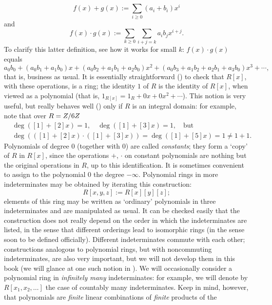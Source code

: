 \[
  f(x) + g(x) := \sum_{i \geq 0} (a_i + b_i) x^i
\]
and
\[
  f(x) \cdot g(x) := \sum_{k \geq 0} \sum_{i+j=k} a_i b_j x^{i+j}.
\]
To clarify this latter definition, see how it works for small $k$:
$f(x) \cdot g(x)$ equals
\[
  a_0 b_0 + (a_0 b_1 + a_1 b_0)x + (a_0 b_2 + a_1 b_1 + a_2 b_0)x^2 +
  (a_0 b_3 + a_1 b_2 + a_2 b_1 + a_3 b_0)x^3 + \cdots,
\]
that is, business as usual.  It is essentially straightforward
() to check that $R[x]$, with these
operations, is a ring; the identity $1$ of $R$ is the identity of
$R[x]$, when viewed as a polynomial (that is,
$1_{R[x]} = 1_R + 0x + 0x^2 + \cdots$).   This
notion is very useful, but really behaves well
() only if $R$ is an integral
domain: for example, note that over $R = Z/6Z$
\begin{align*}
  &\deg([1] + [2]x) = 1, \quad \deg([1] + [3]x) = 1, \quad \text{but} \\
  &\deg(([1] + [2]x) \cdot ([1] + [3]x)) = \deg([1] + [5]x) = 1 \neq 1 + 1.
\end{align*}
Polynomials of degree $0$ (together with $0$) are called
\emph{constants}; they form a `copy' of $R$ in $R[x]$, since the
operations $+$, $\cdot$ on constant polynomials are nothing but the
original operations in $R$, up to this identification. It is sometimes
convenient to assign to the polynomial $0$ the degree $-\infty$.
Polynomial rings in more indeterminates may be obtained by iterating
this construction:
\[
  R[x, y, z] := R[x][y][z];
\]
elements of this ring may be written as `ordinary' polynomials in
three indeterminates and are manipulated as usual. It can be checked
easily that the construction does not really depend on the order in
which the indeterminates are listed, in the sense that different
orderings lead to isomorphic rings (in the sense soon to be defined
officially). Different indeterminates commute with each other;
constructions analogous to polynomial rings, but with noncommuting
indeterminates, are also very important, but we will not develop them
in this book (we will glance at one such notion in
).  We will occasionally consider a polynomial ring
in \emph{infinitely many} indeterminates: for example, we will denote
by $R[x_1, x_2, \ldots]$ the case of countably many
indeterminates. Keep in mind, however, that polynomials are
\emph{finite} linear combinations of \emph{finite} products of the
